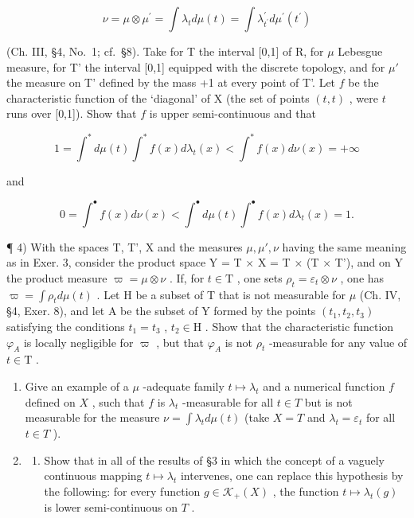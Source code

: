 \[
\nu = \mu \otimes \mu^ {\prime} = \int \lambda_ {t} d \mu (t) = \int \lambda_ {t ^ {\prime}} ^ {\prime} d \mu^ {\prime} (t ^ {\prime})
\]

(Ch. III, §4, No.~1; cf.~§8). Take for T the interval {[}0,1{]} of R, for \(\mu\) Lebesgue measure, for T' the interval {[}0,1{]} equipped with the discrete topology, and for \(\mu'\) the measure on T' defined by the mass +1 at every point of T'. Let \(f\) be the characteristic function of the `diagonal' of X (the set of points \((t,t)\) , were \(t\) runs over {[}0,1{]}). Show that \(f\) is upper semi-continuous and that

\[
1 = \int^ {*} d \mu (t) \int^ {*} f (x) d \lambda_ {t} (x) <   \int^ {*} f (x) d \nu (x) = + \infty
\]

and

\[
0 = \int^ {\bullet} f (x) d \nu (x) <   \int^ {\bullet} d \mu (t) \int^ {\bullet} f (x) d \lambda_ {t} (x) = 1.
\]

¶ 4) With the spaces T, T', X and the measures \(\mu, \mu', \nu\) having the same meaning as in Exer. 3, consider the product space Y = T × X = T × (T × T'), and on Y the product measure \(\varpi = \mu \otimes \nu\) . If, for \(t \in \mathrm{T}\) , one sets \(\rho_t = \varepsilon_t \otimes \nu\) , one has \(\varpi = \int \rho_t d\mu(t)\) . Let H be a subset of T that is not measurable for \(\mu\) (Ch. IV, §4, Exer. 8), and let A be the subset of Y formed by the points \((t_1, t_2, t_3)\) satisfying the conditions \(t_1 = t_3\) , \(t_2 \in \mathrm{H}\) . Show that the characteristic function \(\varphi_A\) is locally negligible for \(\varpi\) , but that \(\varphi_A\) is not \(\rho_t\) -measurable for any value of \(t \in \mathrm{T}\) .

\begin{enumerate}
\def\labelenumi{\arabic{enumi})}
\setcounter{enumi}{4}
\item
  Give an example of a \(\mu\) -adequate family \(t \mapsto \lambda_t\) and a numerical function \(f\) defined on \(X\) , such that \(f\) is \(\lambda_t\) -measurable for all \(t \in T\) but is not measurable for the measure \(\nu = \int \lambda_t d\mu(t)\) (take \(X = T\) and \(\lambda_t = \varepsilon_t\) for all \(t \in T\) ).
\item
  \begin{enumerate}
  \def\labelenumii{\alph{enumii})}
  \tightlist
  \item
    Show that in all of the results of §3 in which the concept of a vaguely continuous mapping \(t \mapsto \lambda_t\) intervenes, one can replace this hypothesis by the following: for every function \(g \in \mathcal{K}_+(X)\) , the function \(t \mapsto \lambda_t(g)\) is lower semi-continuous on \(T\) .
  \end{enumerate}
\end{enumerate}

